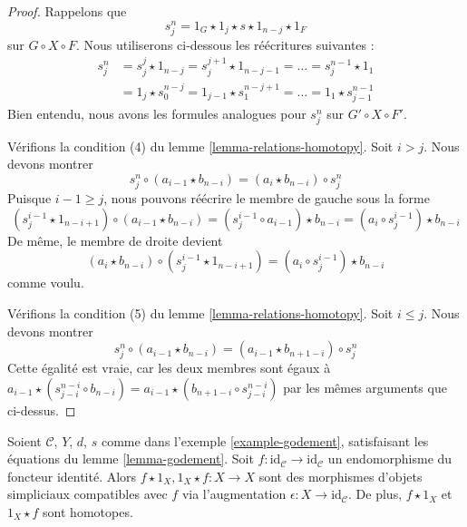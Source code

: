 \begin{proof}
\medskip\noindent
Rappelons que
$$
s^n_j = 1_G \star 1_j \star s \star 1_{n - j} \star 1_F
$$
sur $G \circ X \circ F$. Nous utiliserons ci-dessous les réécritures suivantes :
\begin{align*}
s^n_j
& =
s^j_j \star 1_{n - j} = s^{j + 1}_j \star 1_{n - j - 1} = \ldots =
s^{n - 1}_j \star 1_1 \\
& =
1_j \star s^{n - j}_0 = 1_{j - 1} \star s^{n - j + 1}_1 = \ldots =
1_1 \star s^{n - 1}_{j - 1}
\end{align*}
Bien entendu, nous avons les formules analogues pour $s^n_j$ sur
$G' \circ X \circ F'$.

\medskip\noindent
Vérifions la condition (4) du lemme \ref{lemma-relations-homotopy}.
Soit $i > j$. Nous devons montrer
$$
s^n_j \circ (a_{i - 1} \star b_{n - i}) =
(a_i \star b_{n - i}) \circ s^n_j
$$
Puisque $i - 1 \geq j$, nous pouvons réécrire le membre de gauche sous la forme
$$
(s^{i - 1}_j \star 1_{n - i + 1}) \circ (a_{i - 1} \star b_{n - i}) =
(s^{i - 1}_j \circ a_{i - 1}) \star b_{n - i} =
(a_i \circ s^{i - 1}_j) \star b_{n - i}
$$
De même, le membre de droite devient
$$
(a_i \star b_{n - i}) \circ (s^{i - 1}_j \star 1_{n - i + 1}) =
(a_i \circ s^{i - 1}_j) \star b_{n - i}
$$
comme voulu.

\medskip\noindent
Vérifions la condition (5) du lemme \ref{lemma-relations-homotopy}.
Soit $i \leq j$. Nous devons montrer
$$
s^n_j \circ (a_{i - 1} \star b_{n - i}) =
(a_{i - 1} \star b_{n + 1 - i}) \circ s^n_j
$$
Cette égalité est vraie, car les deux membres sont égaux à
$a_{i - 1} \star (s^{n - i}_{j - i} \circ b_{n - i}) =
a_{i - 1} \star (b_{n + 1 - i} \circ s^{n - i}_{j - i})$
par les mêmes arguments que ci-dessus.
\end{proof}

\begin{lemma}
\label{lemma-godement-before-after}
Soient $\mathcal{C}$, $Y$, $d$, $s$ comme dans l'exemple
\ref{example-godement}, satisfaisant les équations du lemme
\ref{lemma-godement}. Soit
$f : \text{id}_\mathcal{C} \to \text{id}_\mathcal{C}$ un endomorphisme du
foncteur identité. Alors $f \star 1_X, 1_X \star f : X \to X$ sont des
morphismes d'objets simpliciaux compatibles avec $f$ via l'augmentation
$\epsilon : X \to \text{id}_\mathcal{C}$. De plus, $f \star 1_X$ et
$1_X \star f$ sont homotopes.
\end{lemma}

